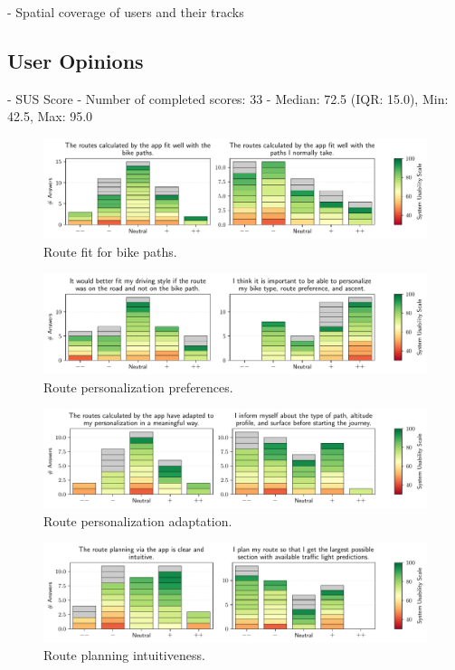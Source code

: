 - Spatial coverage of users and their tracks

\subsection{User Opinions}

- SUS Score
- Number of completed scores: 33
- Median: 72.5 (IQR: 15.0), Min: 42.5, Max: 95.0

\begin{figure}[t]
\caption{Route fit for bike paths.}\label{fig:route-fit-bike-paths}
\includegraphics[width=\linewidth]{images/app-usability-questions-route-fit-bike-paths.pdf}
\end{figure}

\begin{figure}[t]
\caption{Route personalization preferences.}\label{fig:route-personalization}
\includegraphics[width=\linewidth]{images/app-usability-questions-route-personalization.pdf}
\end{figure}

\begin{figure}[t]
\caption{Route personalization adaptation.}\label{fig:route-personalization-adaptation}
\includegraphics[width=\linewidth]{images/app-usability-questions-route-personalization-adaptation.pdf}
\end{figure}
          

\begin{figure}[t]
\caption{Route planning intuitiveness.}\label{fig:route-planning-intuitiveness}
\includegraphics[width=\linewidth]{images/app-usability-questions-route-planning-intuitiveness.pdf}
\end{figure}
          

